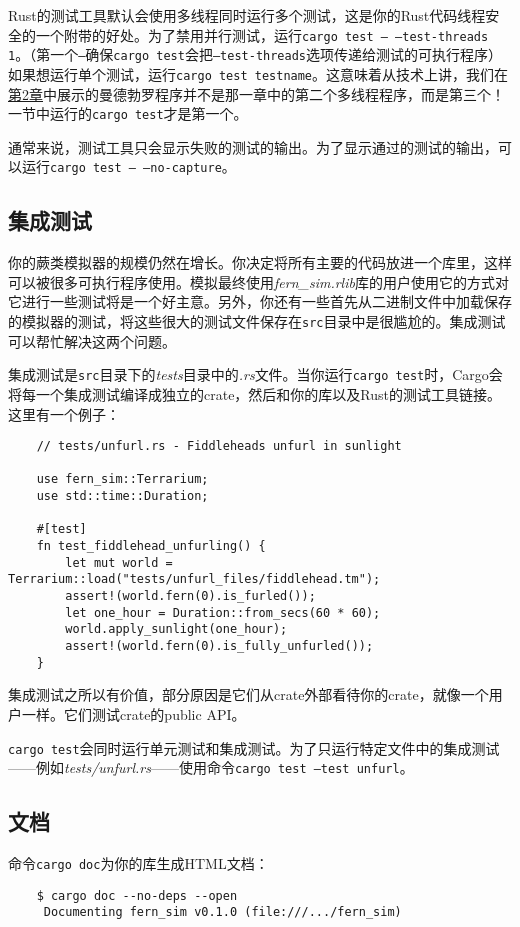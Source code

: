 Rust的测试工具默认会使用多线程同时运行多个测试，这是你的Rust代码线程安全的一个附带的好处。为了禁用并行测试，运行\texttt{cargo test -- --test-threads 1}。（第一个\texttt{--}确保\texttt{cargo test}会把\texttt{--test-threads}选项传递给测试的可执行程序）如果想运行单个测试，运行\texttt{cargo test testname}。这意味着从技术上讲，我们在\hyperref[ch02]{第2章}中展示的曼德勃罗程序并不是那一章中的第二个多线程程序，而是第三个！一节中运行的\texttt{cargo test}才是第一个。

通常来说，测试工具只会显示失败的测试的输出。为了显示通过的测试的输出，可以运行\texttt{cargo test -- --no-capture}。

\subsection{集成测试}
你的蕨类模拟器的规模仍然在增长。你决定将所有主要的代码放进一个库里，这样可以被很多可执行程序使用。模拟最终使用\emph{fern\_sim.rlib}库的用户使用它的方式对它进行一些测试将是一个好主意。另外，你还有一些首先从二进制文件中加载保存的模拟器的测试，将这些很大的测试文件保存在\texttt{src}目录中是很尴尬的。集成测试可以帮忙解决这两个问题。

集成测试是\texttt{src}目录下的\emph{tests}目录中的\emph{.rs}文件。当你运行\texttt{cargo test}时，Cargo会将每一个集成测试编译成独立的crate，然后和你的库以及Rust的测试工具链接。这里有一个例子：
\begin{verbatim}
    // tests/unfurl.rs - Fiddleheads unfurl in sunlight

    use fern_sim::Terrarium;
    use std::time::Duration;

    #[test]
    fn test_fiddlehead_unfurling() {
        let mut world = Terrarium::load("tests/unfurl_files/fiddlehead.tm");
        assert!(world.fern(0).is_furled());
        let one_hour = Duration::from_secs(60 * 60);
        world.apply_sunlight(one_hour);
        assert!(world.fern(0).is_fully_unfurled());
    }
\end{verbatim}

集成测试之所以有价值，部分原因是它们从crate外部看待你的crate，就像一个用户一样。它们测试crate的public API。

\texttt{cargo test}会同时运行单元测试和集成测试。为了只运行特定文件中的集成测试——例如\emph{tests/unfurl.rs}——使用命令\texttt{cargo test --test unfurl}。

\subsection{文档}
命令\texttt{cargo doc}为你的库生成HTML文档：
\begin{verbatim}
    $ cargo doc --no-deps --open
     Documenting fern_sim v0.1.0 (file:///.../fern_sim)
\end{verbatim}

